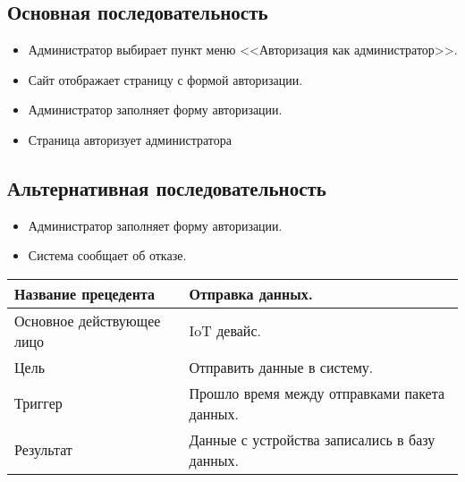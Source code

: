 \subsection{Основная последовательность}
\begin{itemize}
    \item Администратор выбирает пункт меню <<Авторизация как администратор>>.
    \item Сайт отображает страницу с формой авторизации.
    \item Администратор заполняет форму авторизации.
    \item Страница авторизует администратора
\end{itemize}
\subsection{Альтернативная последовательность}
\begin{itemize}
    \item Администратор заполняет форму авторизации.
    \item Система сообщает об отказе.
\end{itemize}

\begin{center}
    \begin{tabularx}{\textwidth}{|X|X|} \hline
    Название прецедента       & Отправка данных.\\ \hline
    Основное действующее лицо & IoT девайс.\\ \hline
    Цель                      & Отправить данные в систему.\\ \hline
    Триггер                   & Прошло время между отправками пакета данных.\\ \hline
    Результат                 & Данные с устройства записались в базу данных. \\ \hline
    \end{tabularx}
\end{center}

